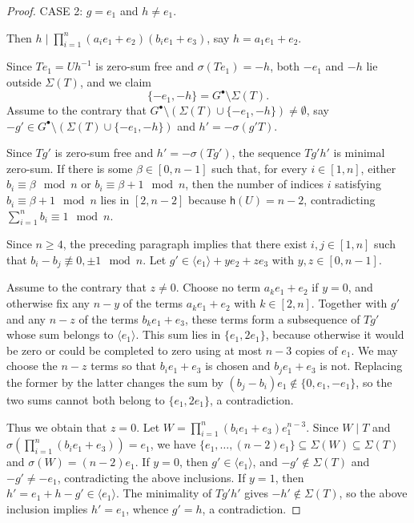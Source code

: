 \documentclass[a4paper, 10pt]{amsart}
\theoremstyle{plain}
\theoremstyle{definition}
\numberwithin{equation}{section}
\begin{document}
{\begin{proof}
	\smallskip
	\noindent
	CASE 2:  $g=e_1$ and $h \ne e_1$.
	
	Then $h\mid \prod_{i=1}^n (a_ie_1+e_2)(b_ie_1+e_3)$, say  $h=a_1e_1+e_2$.
	
	
	Since $Te_1=Uh^{-1}$ is zero-sum free and $\sigma(Te_1)=-h$, both $-e_1$ and $-h$ lie outside $\Sigma(T)$, and we claim
	\[
	\{-e_1,-h\}= G^{\bullet}\setminus \Sigma (T).
	\]
	Assume to the contrary that $G^{\bullet}\setminus \left(\Sigma (T) \cup \{ -e_1,-h\}\right)\ne \emptyset$, say $-g'\in G^{\bullet}\setminus \left(\Sigma (T) \cup \{ -e_1,-h\}\right)$ and $h'=-\sigma(g'T)$.
	
	
 Since $Tg'$ is zero-sum free and $h'=-\sigma(Tg')$, the sequence $Tg'h'$ is minimal zero-sum. If there is some $\beta\in[0,n-1]$ such that, for every $i\in[1,n]$, either $b_i\equiv\beta\mod n$ or $b_i\equiv\beta+1\mod n$, then the number of indices $i$ satisfying $b_i\equiv\beta+1\mod n$ lies in $[2,n-2]$ because $\mathsf h(U)=n-2$, contradicting $\sum_{i=1}^n b_i\equiv1\mod n$.
	
	
	
Since $n\ge4$, the preceding paragraph implies that there exist $i,j\in[1,n]$ such that $b_i-b_j\not\equiv0,\pm1\mod n$. Let  $g'\in\langle e_1\rangle+ye_2+ze_3$ with $y,z\in[0,n-1]$.
	
Assume to the contrary that $z\ne0$. Choose no term $a_ke_1+e_2$ if $y=0$, and otherwise fix any $n-y$ of the terms $a_ke_1+e_2$ with $k\in[2,n]$. Together with $g'$ and any $n-z$ of the terms $b_ke_1+e_3$, these terms form a subsequence of $Tg'$ whose sum belongs to $\langle e_1\rangle$. This sum lies in $\{e_1,2e_1\}$, because otherwise it would be zero or could be completed to zero using at most $n-3$ copies of $e_1$. We may choose the $n-z$ terms so that $b_ie_1+e_3$ is chosen and $b_je_1+e_3$ is not. Replacing the former by the latter changes the sum by $(b_j-b_i)e_1\notin\{0,e_1,-e_1\}$, so the two sums cannot both belong to $\{e_1,2e_1\}$, a contradiction. 
	
Thus we obtain that $z=0$. Let $W=\prod_{i=1}^n(b_ie_1+e_3)e_1^{n-3}$. Since $W\mid T$ and $\sigma(\prod_{i=1}^n(b_ie_1+e_3))=e_1$, we have $\{e_1,\ldots,(n-2)e_1\}\subseteq\Sigma(W)\subseteq\Sigma(T)$ and $\sigma(W)=(n-2)e_1$. If $y=0$, then $g'\in\langle e_1\rangle$, and $-g'\notin\Sigma(T)$ and $-g'\ne-e_1$, contradicting the above inclusions. If $y=1$, then $h'=e_1+h-g'\in\langle e_1\rangle$. The minimality of $Tg'h'$ gives $-h'\notin\Sigma(T)$, so the above inclusion implies $h'=e_1$, whence $g'=h$,  a contradiction.
	

\end{proof}}
\end{document}
